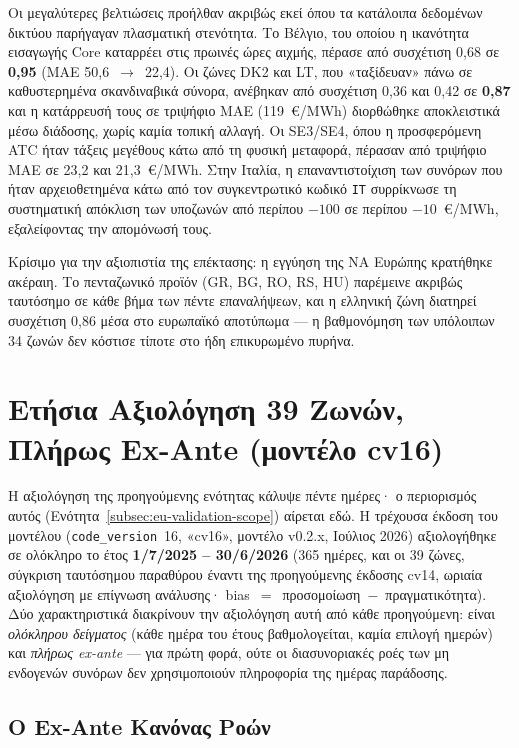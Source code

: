 Οι μεγαλύτερες βελτιώσεις προήλθαν ακριβώς εκεί όπου τα κατάλοιπα δεδομένων δικτύου παρήγαγαν πλασματική στενότητα. Το Βέλγιο, του οποίου η ικανότητα εισαγωγής Core καταρρέει στις πρωινές ώρες αιχμής, πέρασε από συσχέτιση 0,68 σε \textbf{0,95} (MAE 50,6~$\to$~22,4). Οι ζώνες DK2 και LT, που «ταξίδευαν» πάνω σε καθυστερημένα σκανδιναβικά σύνορα, ανέβηκαν από συσχέτιση 0,36 και 0,42 σε \textbf{0,87} και η κατάρρευσή τους σε τριψήφιο MAE (119~€/MWh) διορθώθηκε αποκλειστικά μέσω διάδοσης, χωρίς καμία τοπική αλλαγή. Οι SE3/SE4, όπου η προσφερόμενη ATC ήταν τάξεις μεγέθους κάτω από τη φυσική μεταφορά, πέρασαν από τριψήφιο MAE σε 23,2 και 21,3~€/MWh. Στην Ιταλία, η επαναντιστοίχιση των συνόρων που ήταν αρχειοθετημένα κάτω από τον συγκεντρωτικό κωδικό \texttt{IT} συρρίκνωσε τη συστηματική απόκλιση των υποζωνών από περίπου $-100$ σε περίπου $-10$~€/MWh, εξαλείφοντας την απομόνωσή τους.

Κρίσιμο για την αξιοπιστία της επέκτασης: η εγγύηση της ΝΑ Ευρώπης κρατήθηκε ακέραιη. Το πενταζωνικό προϊόν (GR, BG, RO, RS, HU) παρέμεινε ακριβώς ταυτόσημο σε κάθε βήμα των πέντε επαναλήψεων, και η ελληνική ζώνη διατηρεί συσχέτιση 0,86 μέσα στο ευρωπαϊκό αποτύπωμα --- η βαθμονόμηση των υπόλοιπων 34 ζωνών δεν κόστισε τίποτε στο ήδη επικυρωμένο πυρήνα.


\section{Ετήσια Αξιολόγηση 39 Ζωνών, Πλήρως Ex-Ante (μοντέλο cv16)}
\label{sec:cv16-fullyear}

Η αξιολόγηση της προηγούμενης ενότητας κάλυψε πέντε ημέρες· ο περιορισμός αυτός (Ενότητα~\ref{subsec:eu-validation-scope}) αίρεται εδώ. Η τρέχουσα έκδοση του μοντέλου (\texttt{code\_version}~16, «cv16», μοντέλο v0.2.x, Ιούλιος 2026) αξιολογήθηκε σε ολόκληρο το έτος \textbf{1/7/2025 -- 30/6/2026} (365 ημέρες, και οι 39 ζώνες, σύγκριση ταυτόσημου παραθύρου έναντι της προηγούμενης έκδοσης cv14, ωριαία αξιολόγηση με επίγνωση ανάλυσης· bias~$=$~προσομοίωση~$-$~πραγματικότητα). Δύο χαρακτηριστικά διακρίνουν την αξιολόγηση αυτή από κάθε προηγούμενη: είναι \emph{ολόκληρου δείγματος} (κάθε ημέρα του έτους βαθμολογείται, καμία επιλογή ημερών) και \emph{πλήρως ex-ante} --- για πρώτη φορά, ούτε οι διασυνοριακές ροές των μη ενδογενών συνόρων δεν χρησιμοποιούν πληροφορία της ημέρας παράδοσης.

\subsection{Ο Ex-Ante Κανόνας Ροών}
\label{subsec:exante-flows}


